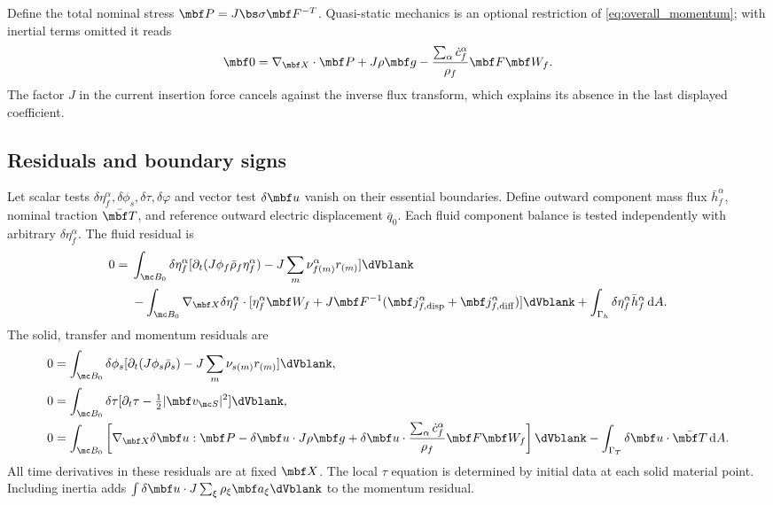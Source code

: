 \documentclass[11pt]{article}
\begin{document}
Define the total nominal stress \(\mbf P=J\bs\sigma\mbf F^{-T}\).
Quasi-static mechanics is an optional restriction of \eqref{eq:overall_momentum}; with inertial terms omitted it reads
\begin{equation}
 \mbf0=\nabla_{\mbf X}\cdot\mbf P+J\rho\mbf g
 -\frac{\sum_\alpha\dot c_f^\alpha}{\rho_f}\mbf F\mbf W_f.
 \label{eq:reference_momentum}
\end{equation}
The factor \(J\) in the current insertion force cancels against the inverse flux transform, which explains its absence in the last displayed coefficient.

\subsection{Residuals and boundary signs}
Let scalar tests \(\delta\eta_f^\alpha,\delta\phi_s,\delta\tau,\delta\varphi\) and vector test \(\delta\mbf u\) vanish on their essential boundaries. Define outward component mass flux \(\bar h_f^\alpha\), nominal traction \(\bar{\mbf T}\), and reference outward electric displacement \(\bar q_0\). Each fluid component balance is tested independently with arbitrary \(\delta\eta_f^\alpha\). The fluid residual is
\begin{align}
 0={}&\int_{\mc B_0}\delta\eta_f^\alpha
 [\partial_t(J\phi_f\bar\rho_f\eta_f^\alpha)-J\sum_m\nu_{f(m)}^\alpha r_{(m)}]\dVblank\notag\\
 &-\int_{\mc B_0}\nabla_{\mbf X}\delta\eta_f^\alpha\cdot
 [\eta_f^\alpha\mbf W_f+J\mbf F^{-1}(\mbf j_{f,{\rm disp}}^\alpha+\mbf j_{f,{\rm diff}}^\alpha)]\dVblank
 +\int_{\Gamma_h}\delta\eta_f^\alpha\bar h_f^\alpha\,{\rm d}A.
 \label{eq:weak_fluid}
\end{align}
The solid, transfer and momentum residuals are
\begin{align}
 0&=\int_{\mc B_0}\delta\phi_s[\partial_t(J\phi_s\bar\rho_s)-J\sum_m\nu_{s(m)}r_{(m)}]\dVblank,\label{eq:weak_solid}\\
 0&=\int_{\mc B_0}\delta\tau[\partial_t\tau-\tfrac12|\mbf v_{\mc S}|^2]\dVblank,\label{eq:weak_tau}\\
 0&=\int_{\mc B_0}\left[\nabla_{\mbf X}\delta\mbf u:\mbf P
 -\delta\mbf u\cdot J\rho\mbf g
 +\delta\mbf u\cdot\frac{\sum_\alpha\dot c_f^\alpha}{\rho_f}\mbf F\mbf W_f\right]\dVblank
 -\int_{\Gamma_T}\delta\mbf u\cdot\bar{\mbf T}\,{\rm d}A.\label{eq:weak_momentum}
\end{align}
All time derivatives in these residuals are at fixed \(\mbf X\). The local \(\tau\) equation is determined by initial data at each solid material point. Including inertia adds \(\int\delta\mbf u\cdot J\sum_\xi\rho_\xi\mbf a_\xi\dVblank\) to the momentum residual.
\end{document}
